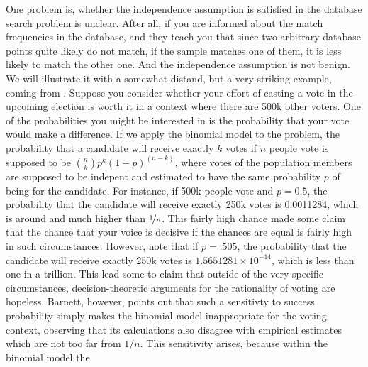 \documentclass[10pt,dvipsnames,enabledeprecatedfontcommands]{scrartcl}
\begin{document}
One problem is, whether the independence assumption is satisfied in the
database search problem is unclear. After all, if you are informed about
the match frequencies in the database, and they teach you that since two
arbitrary database points quite likely do not match, if the sample
matches one of them, it is less likely to match the other one. And the
independence assumption is not benign. We will illustrate it with a
somewhat distand, but a very striking example, coming from
. Suppose you consider whether your effort of casting
a vote in the upcoming election is worth it in a context where there are
500k other voters. One of the probabilities you might be interested in
is the probability that your vote would make a difference. If we apply
the binomial model to the problem, the probability that a candidate will
receive exactly \(k\) votes if \(n\) people vote is supposed to be
\({n \choose k} p^{k} (1-p)^{(n-k)}\), where votes of the population
members are supposed to be indepent and estimated to have the same
probability \(p\) of being for the candidate. For instance, if 500k
people vote and \(p= 0.5\), the probability that the candidate will
receive exactly 250k votes is 0.0011284, which is around
 and much higher than \(\nicefrac{1}{n}\). This fairly
high chance made some claim that the chance that your voice is decisive
if the chances are equal is fairly high in such circumstances. However,
note that if \(p=.505\), the probability that the candidate will receive
exactly 250k votes is \ensuremath{1.5651281\times 10^{-14}}, which is
less than one in a trillion. This lead some
 to claim that
outside of the very specific circumstances, decision-theoretic arguments
for the rationality of voting are hopeless. Barnett, 
however, points out that such a sensitivty to success probability simply
makes the binomial model inappropriate for the voting context, observing
that its calculations also disagree with empirical estimates which are
not too far from \(1/n\).
 This sensitivity arises, because within the binomial model the
\end{document}
